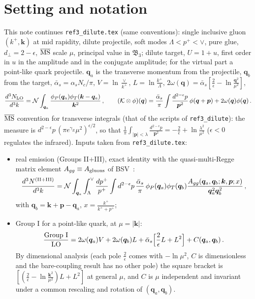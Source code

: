 \documentclass[11pt,a4paper]{article}
\renewcommand{\v}[1]{\bm{#1}}
\newcommand{\ab}{\bar\alpha_s}
\newcommand{\MSbar}{\overline{\rm MS}}
\begin{document}
\section{Setting and notation}
This note continues \texttt{ref3\_dilute.tex} (same conventions): single inclusive gluon $(k^+,\v k)$ at mid rapidity, dilute projectile, soft modes $\Lambda<p^+<\vee$, pure glue, $d_\perp=2-\epsilon$, $\MSbar$ scale $\mu$, principal value in $\mathfrak B_3$; dilute target, $U=1+u$, first order in $u$ in the amplitude and in the conjugate amplitude; for the virtual part a point-like quark projectile. $\v q_a$ is the transverse momentum from the projectile, $\v q_b$ from the target, $\ab=\alpha_sN_c/\pi$, $V=\ln\frac{\vee}{k^+}$, $L=\ln\frac{k^+}{\Lambda}$, $2\omega(\v q)=\ab[\frac2\epsilon-\ln\frac{\v q^2}{\mu^2}]$,
\begin{align}
\frac{d^3N_{\rm LO}}{d^3k}=\mathcal N\int_{\v q_a}\frac{\phi_P(\v q_a)\phi_T(\v k-\v q_a)}{\v k^2}\,,\qquad
(\mathcal K\otimes\phi)(\v q)=\frac{\ab}{\pi}\int\frac{d^{2-\epsilon}p}{\v p^2}\,\phi(\v q+\v p)+2\omega(\v q)\phi(\v q)\,.
\end{align}
$\MSbar$ convention for transverse integrals (that of the scripts of \texttt{ref3\_dilute}): the measure is $d^{2-\epsilon}p\,(\pi e^{\gamma_E}\mu^2)^{\epsilon/2}$, so that $\frac1\pi\int_{|\v p|<\lambda}\frac{d^{2-\epsilon}p}{\v p^2}=-\frac2\epsilon+\ln\frac{\lambda^2}{\mu^2}$ ($\epsilon<0$ regulates the infrared). Inputs taken from \texttt{ref3\_dilute.tex}:
\begin{itemize}
\item[(R)] real emission (Groups II$+$III), exact identity with the quasi-multi-Regge matrix element $A_{gg}\equiv A_{\rm gluons}$ of BSV~\cite{BSV}:
\begin{align}
\frac{d^3N^{\rm(II+III)}}{d^3k}=\mathcal N\int_{\v q_a}\int_\Lambda^\vee\frac{dp^+}{p^+}\int d^{2-\epsilon}p\,\frac{\ab}{\pi}\,\phi_P(\v q_a)\phi_T(\v q_b)\frac{A_{gg}(\v q_a,\v q_b;\v k,\v p;x)}{\v q_a^2\v q_b^2}\,,\label{real}
\end{align}
with $\v q_b=\v k+\v p-\v q_a$, $x=\frac{k^+}{k^++p^+}$;
\item[(V)] Group I for a point-like quark, at $\mu=|\v k|$:
\begin{align}
\frac{\text{Group I}}{\rm LO}=2\omega(\v q_a)V+2\omega(\v q_b)L+\ab\Big[\frac2\epsilon L+L^2\Big]+C(\v q_a,\v q_b)\,.\label{virt}
\end{align}
By dimensional analysis (each pole $\frac2\epsilon$ comes with $-\ln\mu^2$, $C$ is dimensionless and the bare-coupling result has no other pole) the square bracket is $[(\frac2\epsilon-\ln\frac{\v k^2}{\mu^2})L+L^2]$ at general $\mu$, and $C$ is $\mu$ independent and invariant under a common rescaling and rotation of $(\v q_a,\v q_b)$.
\end{itemize}
\end{document}
